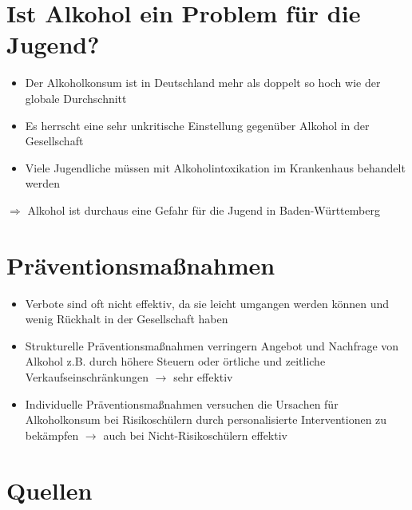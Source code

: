 \documentclass[12pt]{article}
\begin{document}
 \section*{Ist Alkohol ein Problem für die Jugend?}
 \begin{itemize}
    \item Der Alkoholkonsum ist in Deutschland mehr als doppelt so hoch wie der globale Durchschnitt
    \item Es herrscht eine sehr unkritische Einstellung gegenüber Alkohol in der Gesellschaft
    \item Viele Jugendliche müssen mit Alkoholintoxikation im Krankenhaus behandelt werden
 \end{itemize}
 \par$\Rightarrow$ Alkohol ist durchaus eine Gefahr für die Jugend in Baden-Württemberg

 \section*{Präventionsmaßnahmen}
 \begin{itemize}
    \item Verbote sind oft nicht effektiv, da sie leicht umgangen werden können und wenig Rückhalt in der Gesellschaft haben
    \item Strukturelle Präventionsmaßnahmen verringern Angebot und Nachfrage von Alkohol z.B. durch höhere Steuern oder örtliche und zeitliche Verkaufseinschränkungen $\rightarrow$ sehr effektiv
    \item Individuelle Präventionsmaßnahmen versuchen die Ursachen für Alkoholkonsum bei Risikoschülern durch personalisierte Interventionen zu bekämpfen $\rightarrow$ auch bei Nicht-Risikoschülern effektiv
\end{itemize}

 \section*{Quellen}
\end{document}

